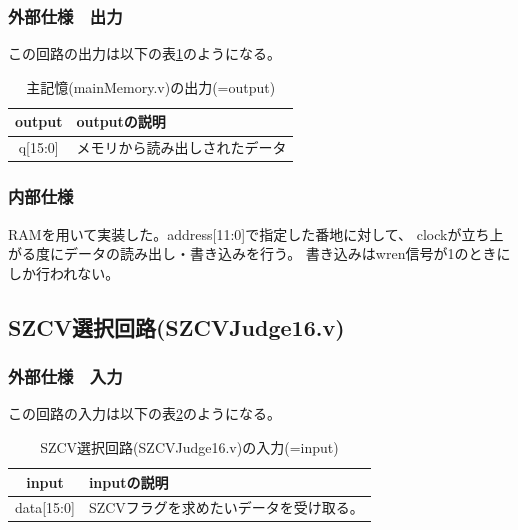 \documentclass[a4j,titlepage]{jarticle}
\begin{document}
\subsubsection{外部仕様　出力}
この回路の出力は以下の表\ref{mainMemoryO}のようになる。
\begin{table}[H]
    \caption{主記憶(mainMemory.v)の出力(=output)}
    \label{mainMemoryO}
    \begin{center}
    \begin {tabularx}{150mm}{|c|X|} \hline
         output & outputの説明 \\ \hline \hline
         q[15:0] & メモリから読み出しされたデータ\\ \hline
    \end {tabularx}
    \end{center}
\end{table}

\subsubsection{内部仕様}
RAMを用いて実装した。address[11:0]で指定した番地に対して、
clockが立ち上がる度にデータの読み出し・書き込みを行う。
書き込みはwren信号が1のときにしか行われない。



\newpage
\subsection{SZCV選択回路(SZCVJudge16.v)}

\subsubsection{外部仕様　入力}
この回路の入力は以下の表\ref{szcvjudgeI}のようになる。
\begin{table}[H]
    \caption{SZCV選択回路(SZCVJudge16.v)の入力(=input)}
    \label{szcvjudgeI}
    \begin{center}
    \begin {tabularx}{150mm}{|c|X|} \hline
         input & inputの説明 \\ \hline \hline
         data[15:0] & SZCVフラグを求めたいデータを受け取る。\\ \hline
    \end{tabularx}
    \end{center}
\end{table}
\end{document}
